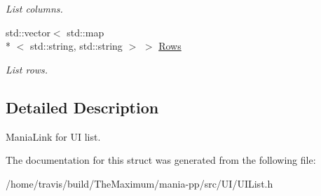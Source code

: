 \begin{DoxyCompactItemize}
\begin{DoxyCompactList}\small\item\em List columns. \end{DoxyCompactList}\item 
\hypertarget{structUIList_a065ea3da2ed6cb0524e9a0daae2be06a}{std\-::vector$<$ std\-::map\\*
$<$ std\-::string, std\-::string $>$ $>$ \hyperlink{structUIList_a065ea3da2ed6cb0524e9a0daae2be06a}{Rows}}\label{structUIList_a065ea3da2ed6cb0524e9a0daae2be06a}

\begin{DoxyCompactList}\small\item\em List rows. \end{DoxyCompactList}\end{DoxyCompactItemize}


\subsection{Detailed Description}
Mania\-Link for U\-I list. 

The documentation for this struct was generated from the following file\-:\begin{DoxyCompactItemize}
\item 
/home/travis/build/\-The\-Maximum/mania-\/pp/src/\-U\-I/U\-I\-List.\-h\end{DoxyCompactItemize}
